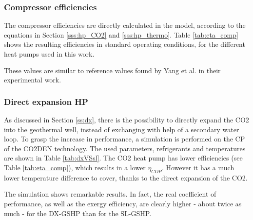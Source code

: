 \documentclass{article}
\begin{document}
\subsubsection{Compressor efficiencies}
The compressor efficiencies are directly calculated in the model, according to the equations in Section \ref{sss:hp_CO2} and \ref{sss:hp_thermo}. Table \ref{tab:eta_comp} shows the resulting efficiencies in standard operating conditions, for the different heat pumps used in this work.



These values are similar to reference values found by Yang et al.\cite{yangTheoreticalExperimentalInvestigation2016} in their experimental work.




\subsubsection{Direct expansion HP}\label{sss:DX}
As discussed in Section \ref{ss:dx}, there is the possibility to directly expand the CO2 into the geothermal well, instead of exchanging with help of a secondary water loop. To grasp the increase in performance, a simulation is performed on the CP of the CO2DEN technology. The used parameters, refrigerants and temperatures are shown in Table \ref{tab:dxVSsl}. The CO2 heat pump has lower efficiencies (see Table \ref{tab:eta_comp}), which results in a lower $\eta_{COP}$. However it has a much lower temperature difference to cover, thanks to the direct expansion of the CO2.



The simulation shows remarkable results. In fact, the real coefficient of performance, as well as the exergy efficiency, are clearly higher - about twice as much - for the DX-GSHP than for the SL-GSHP. 
\end{document}
